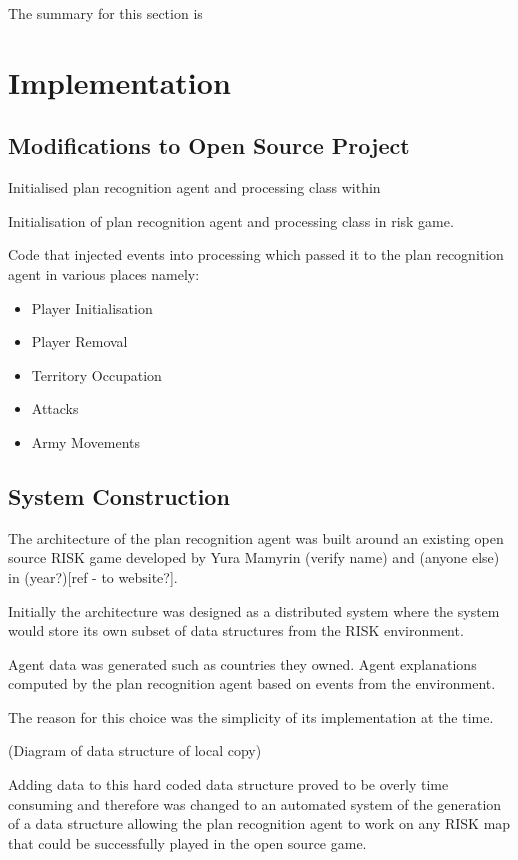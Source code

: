 \documentclass[parskip]{cs4rep}
\begin{document}
The summary for this section is

\chapter{Implementation}

\section{Modifications to Open Source Project}

Initialised plan recognition agent and processing class within 

Initialisation of plan recognition agent and processing class in risk game.

Code that injected events into processing which passed it to the plan recognition agent in various places namely:

\begin{itemize}
\item
Player Initialisation
\item
Player Removal
\item
Territory Occupation
\item
Attacks
\item
Army Movements
\end{itemize}

\section{System Construction}

The architecture of the plan recognition agent was built around an existing open source RISK game developed by Yura Mamyrin (verify name) and (anyone else) in (year?)[ref - to website?].

Initially the architecture was designed as a distributed system where the system would store its own subset of data structures from the RISK environment.

Agent data was generated such as countries they owned.
Agent explanations computed by the plan recognition agent based on events from the environment.

The reason for this choice was the simplicity of its implementation at the time.

(Diagram of data structure of local copy)

Adding data to this hard coded data structure proved to be overly time consuming and therefore was changed to an automated system of the generation of a data structure allowing the plan recognition agent to work on any RISK map that could be successfully played in the open source game.
\end{document}
